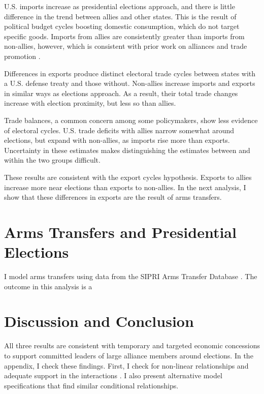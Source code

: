 \documentclass[12pt]{article}
\begin{document}
U.S. imports increase as presidential elections approach, and there is little difference in the trend between allies and other states. 
This is the result of political budget cycles boosting domestic consumption, which do not target specific goods.
Imports from allies are consistently greater than imports from non-allies, however, which is consistent with prior work on alliances and trade promotion \citep{GowaMansfield2004}. 


Differences in exports produce distinct electoral trade cycles between states with a U.S. defense treaty and those without. 
Non-allies increase imports and exports in similar ways as elections approach. 
As a result, their total trade changes increase with election proximity, but less so than allies. 


Trade balances, a common concern among some policymakers, show less evidence of electoral cycles. 
U.S. trade deficits with allies narrow somewhat around elections, but expand with non-allies, as imports rise more than exports. 
Uncertainty in these estimates makes distinguishing the estimates between and within the two groups difficult.


These results are consistent with the export cycles hypothesis. 
Exports to allies increase more near elections than exports to non-allies.
In the next analysis, I show that these differences in exports are the result of arms transfers.



\section{Arms Transfers and Presidential Elections}


I model arms transfers using data from the SIPRI Arms Transfer Database \citep{SIPRI2021}.
The outcome in this analysis is a 





\section{Discussion and Conclusion}


All three results are consistent with temporary and targeted economic concessions to support committed leaders of large alliance members around elections. 
In the appendix, I check these findings.
First, I check for non-linear relationships and adequate support in the interactions \citep{Hainmuelleretal2019}. 
I also present alternative model specifications that find similar conditional relationships.
\end{document}
